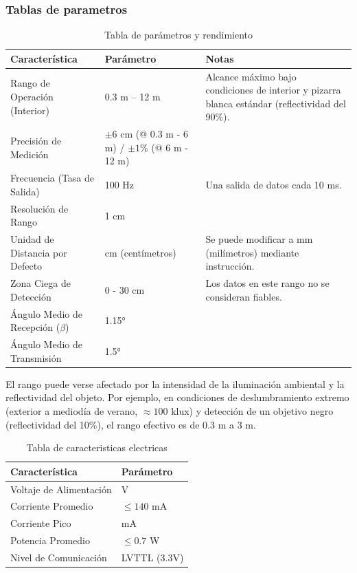 \documentclass[12pt,a4paper]{article}
\begin{document}
\subsubsection{Tablas de parametros}

\begin{table}[H]
\centering
\begin{tabular}{|p{5cm}|p{5cm}|p{5cm}|}
\hline
\textbf{Característica} & \textbf{Parámetro} & \textbf{Notas} \\
\hline
Rango de Operación (Interior) & 0.3 m -- 12 m & Alcance máximo bajo condiciones de interior y pizarra blanca estándar (reflectividad del 90\%). \\
\hline
Precisión de Medición & $\pm 6$ cm (@ 0.3 m - 6 m) / $\pm 1\%$ (@ 6 m - 12 m) &  \\
\hline
Frecuencia (Tasa de Salida) & 100 Hz & Una salida de datos cada 10 ms. \\
\hline
Resolución de Rango & 1 cm &  \\
\hline
Unidad de Distancia por Defecto & cm (centímetros) & Se puede modificar a mm (milímetros) mediante instrucción. \\
\hline
Zona Ciega de Detección & 0 - 30 cm & Los datos en este rango no se consideran fiables. \\
\hline
Ángulo Medio de Recepción ($\beta$) & 1.15° &  \\
\hline
Ángulo Medio de Transmisión & 1.5° &  \\
\hline
\end{tabular}
\caption{Tabla de parámetros y rendimiento}
\end{table}

El rango puede verse afectado por la intensidad de la iluminación ambiental y la reflectividad del objeto. Por ejemplo, en condiciones de deslumbramiento extremo (exterior a mediodía de verano, $\approx 100$ klux) y detección de un objetivo negro (reflectividad del 10\%), el rango efectivo es de 0.3 m a 3 m.


\begin{table}[H]
\centering
\begin{tabular}{|>{\raggedright}p{5cm}|>{\raggedright\arraybackslash}p{5cm}|}
\hline
\textbf{Característica} & \textbf{Parámetro} \\
\hline
Voltaje de Alimentación & 5 V \\
\hline
Corriente Promedio & $\leq 140$ mA \\
\hline
Corriente Pico & 800 mA \\
\hline
Potencia Promedio & $\leq 0.7$ W \\
\hline
Nivel de Comunicación & LVTTL (3.3V) \\
\hline
\end{tabular}
\caption{Tabla de caracteristicas electricas}
\end{table}
\end{document}
